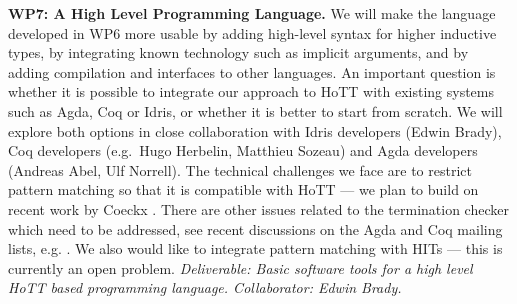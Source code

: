 \documentclass[a4paper,11pt]{article}
\newcommand{\eg}{{e.g.}\ }
\begin{document}


{\bf WP7: A High Level Programming Language.} We will make the
language developed in WP6 more usable by adding high-level syntax for
higher inductive types, by integrating known technology such as
implicit arguments, and by adding compilation and interfaces to other
languages. An important question is whether it is possible to
integrate our approach to HoTT with existing systems such as Agda, Coq
or Idris, or whether it is better to start from scratch.  We will
explore both options in close collaboration with Idris developers
(Edwin Brady), Coq developers (\eg Hugo Herbelin, Matthieu Sozeau) and
Agda developers (Andreas Abel, Ulf Norrell). The technical challenges
we face are to restrict pattern matching so that it is compatible with
HoTT --- we plan to build on recent work by Coeckx
\cite{coeckx-without-k}. There are other issues related to the
termination checker which need to be addressed, see recent discussions
on the Agda and Coq mailing lists, e.g. \cite{agda-issue}.  We also
would like to integrate pattern matching with HITs --- this is
currently an open problem.  {\em Deliverable: Basic software tools for
  a high level HoTT based programming language. Collaborator: Edwin
  Brady.}



\end{document}
